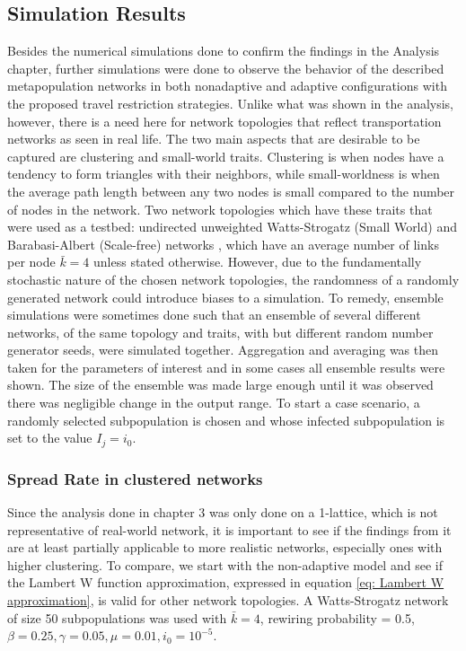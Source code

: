 \newpage
\subsection{Simulation Results}

Besides the numerical simulations done to confirm the findings in the Analysis chapter, further simulations were done to observe the behavior of the described metapopulation networks in both nonadaptive and adaptive configurations with the proposed travel restriction strategies. Unlike what was shown in the analysis, however, there is a need here for network topologies that reflect transportation networks as seen in real life. The two main aspects that are desirable to be captured are clustering and small-world traits. Clustering is when nodes have a tendency to form triangles with their neighbors, while small-worldness is when the average path length between any two nodes is small compared to the number of nodes in the network. Two network topologies which have these traits that were used as a testbed: undirected unweighted Watts-Strogatz (Small World) and Barabasi-Albert (Scale-free) networks %
, which have an average number of links per node $\bar k=4$ unless stated otherwise. However, due to the fundamentally stochastic nature of the chosen network topologies, the randomness of a randomly generated network could introduce biases to a simulation. To remedy, ensemble simulations were sometimes done such that an ensemble of several different networks, of the same topology and traits, with but different random number generator seeds, were simulated together. Aggregation and averaging was then taken for the parameters of interest and in some cases all ensemble results were shown. The size of the ensemble was made large enough until it was observed there was negligible change in the output range. To start a case scenario, a randomly selected subpopulation is chosen and whose infected subpopulation is set to the value $I_j=i_0$.\\ 


\subsubsection{Spread Rate in clustered networks}
Since the analysis done in chapter 3 was only done on a 1-lattice, which is not representative of real-world network, it is important to see if the findings from it are at least partially applicable to more realistic networks, especially ones with higher clustering. To compare, we start with the non-adaptive model and see if the Lambert W function approximation, expressed in equation \ref{eq: Lambert W approximation}, is valid for other network topologies. A Watts-Strogatz network of size 50 subpopulations was used with $\bar k=4$, rewiring probability = 0.5, $\beta=0.25,\gamma=0.05,\mu=0.01,i_0=10^{-5}$.\\

